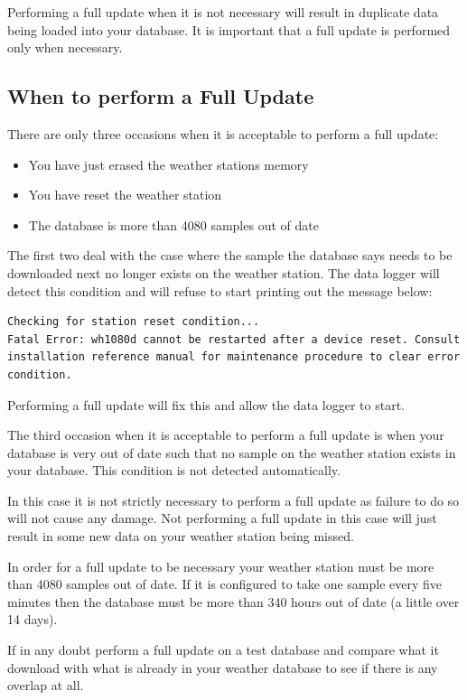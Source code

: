 \documentclass[a4paper,10pt,draft]{book}
\begin{document}
Performing a full update when it is not necessary will result in duplicate data being loaded into your database. It is important that a full update is performed only when necessary.

\subsection{When to perform a Full Update}
There are only three occasions when it is acceptable to perform a full update:
\begin{itemize}
\item You have just erased the weather stations memory
\item You have reset the weather station
\item The database is more than 4080 samples out of date
\end{itemize}

The first two deal with the case where the sample the database says needs to be downloaded next no longer exists on the weather station. The data logger will detect this condition and will refuse to start printing out the message below:
\begin{verbatim}
Checking for station reset condition...
Fatal Error: wh1080d cannot be restarted after a device reset. Consult 
installation reference manual for maintenance procedure to clear error
condition.
\end{verbatim}

Performing a full update will fix this and allow the data logger to start.

The third occasion when it is acceptable to perform a full update is when your database is very out of date such that no sample on the weather station exists in your database. This condition is not detected automatically.

In this case it is not strictly necessary to perform a full update as failure to do so will not cause any damage. Not performing a full update in this case will just result in some new data on your weather station being missed.

In order for a full update to be necessary your weather station must be more than 4080 samples out of date. If it is configured to take one sample every five minutes then the database must be more than 340 hours out of date (a little over 14 days).

If in any doubt perform a full update on a test database and compare what it download with what is already in your weather database to see if there is any overlap at all.
\end{document}
